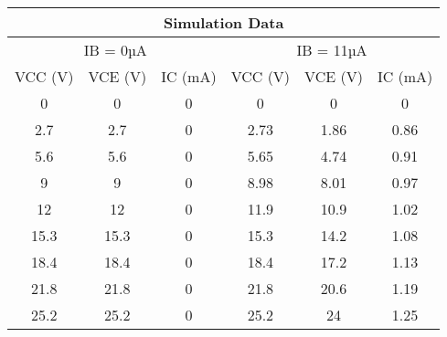 \documentclass[a4paper, 12pt]{extarticle}
\begin{document}
\newpage
\restoregeometry
{}
\begin{table}[htbp]
  \centering
    \begin{tabular}{cccccc}
    \toprule
    \multicolumn{6}{|c|}{Simulation Data} \\
    \midrule
    \multicolumn{3}{|c|}{IB = 0µA} & \multicolumn{3}{c|}{IB = 11µA} \\
    \midrule
    \multicolumn{1}{|c|}{VCC (V)} & \multicolumn{1}{c|}{VCE (V)} & \multicolumn{1}{c|}{IC (mA)} & \multicolumn{1}{c|}{VCC (V)} & \multicolumn{1}{c|}{VCE (V)} & \multicolumn{1}{c|}{IC (mA)} \\
    \midrule
    \multicolumn{1}{|c|}{0} & \multicolumn{1}{c|}{0} & \multicolumn{1}{c|}{0} & \multicolumn{1}{c|}{0} & \multicolumn{1}{c|}{0} & \multicolumn{1}{c|}{0} \\
    \midrule
    \multicolumn{1}{|c|}{2.7} & \multicolumn{1}{c|}{2.7} & \multicolumn{1}{c|}{0} & \multicolumn{1}{c|}{2.73} & \multicolumn{1}{c|}{1.86} & \multicolumn{1}{c|}{0.86} \\
    \midrule
    \multicolumn{1}{|c|}{5.6} & \multicolumn{1}{c|}{5.6} & \multicolumn{1}{c|}{0} & \multicolumn{1}{c|}{5.65} & \multicolumn{1}{c|}{4.74} & \multicolumn{1}{c|}{0.91} \\
    \midrule
    \multicolumn{1}{|c|}{9} & \multicolumn{1}{c|}{9} & \multicolumn{1}{c|}{0} & \multicolumn{1}{c|}{8.98} & \multicolumn{1}{c|}{8.01} & \multicolumn{1}{c|}{0.97} \\
    \midrule
    \multicolumn{1}{|c|}{12} & \multicolumn{1}{c|}{12} & \multicolumn{1}{c|}{0} & \multicolumn{1}{c|}{11.9} & \multicolumn{1}{c|}{10.9} & \multicolumn{1}{c|}{1.02} \\
    \midrule
    \multicolumn{1}{|c|}{15.3} & \multicolumn{1}{c|}{15.3} & \multicolumn{1}{c|}{0} & \multicolumn{1}{c|}{15.3} & \multicolumn{1}{c|}{14.2} & \multicolumn{1}{c|}{1.08} \\
    \midrule
    \multicolumn{1}{|c|}{18.4} & \multicolumn{1}{c|}{18.4} & \multicolumn{1}{c|}{0} & \multicolumn{1}{c|}{18.4} & \multicolumn{1}{c|}{17.2} & \multicolumn{1}{c|}{1.13} \\
    \midrule
    \multicolumn{1}{|c|}{21.8} & \multicolumn{1}{c|}{21.8} & \multicolumn{1}{c|}{0} & \multicolumn{1}{c|}{21.8} & \multicolumn{1}{c|}{20.6} & \multicolumn{1}{c|}{1.19} \\
    \midrule
    \multicolumn{1}{|c|}{25.2} & \multicolumn{1}{c|}{25.2} & \multicolumn{1}{c|}{0} & \multicolumn{1}{c|}{25.2} & \multicolumn{1}{c|}{24} & \multicolumn{1}{c|}{1.25} \\

\end{tabular}
\end{table}
\end{document}
